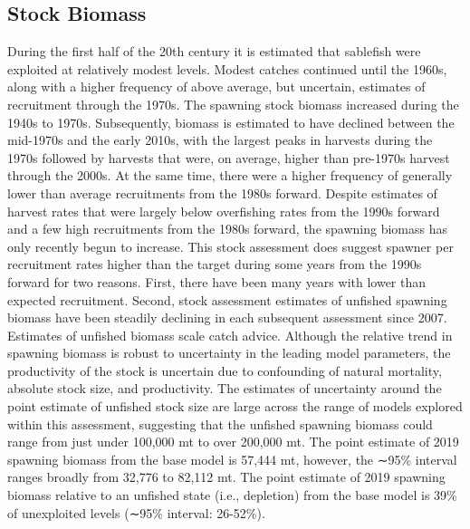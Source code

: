 \documentclass[11pt,
  english,
  a4paper,
]{article}
\begin{document}
\leavevmode\tagmcend\tagstructend\par


\hypertarget{stock-biomass}{%
\subsection*{Stock Biomass}\label{stock-biomass}}

\leavevmode\tagmcend\tagstructend


During the first half of the 20th century it is estimated that sablefish were exploited at relatively modest levels. Modest catches continued until the 1960s, along with a higher frequency of above average, but uncertain, estimates of recruitment through the 1970s. The spawning stock biomass increased during the 1940s to 1970s. Subsequently, biomass is estimated to have declined between the mid-1970s and the early 2010s, with the largest peaks in harvests during the 1970s followed by harvests that were, on average, higher than pre-1970s harvest through the 2000s. At the same time, there were a higher frequency of generally lower than average recruitments from the 1980s forward. Despite estimates of harvest rates that were largely below overfishing rates from the 1990s forward and a few high recruitments from the 1980s forward, the spawning biomass has only recently begun to increase. This stock assessment does suggest spawner per recruitment rates higher than the target during some years from the 1990s forward for two reasons. First, there have been many years with lower than expected recruitment. Second, stock assessment estimates of unfished spawning biomass have been steadily declining in each subsequent assessment since 2007. Estimates of unfished biomass scale catch advice. Although the relative trend in spawning biomass is robust to uncertainty in the leading model parameters, the productivity of the stock is uncertain due to confounding of natural mortality, absolute stock size, and productivity. The estimates of uncertainty around the point estimate of unfished stock size are large across the range of models explored within this assessment, suggesting that the unfished spawning biomass could range from just under 100,000 mt to over 200,000 mt. The point estimate of 2019 spawning biomass from the base model is 57,444 mt, however, the ∼95\% interval ranges broadly from 32,776 to 82,112 mt. The point estimate of 2019 spawning biomass relative to an unfished state (i.e., depletion) from the base model is 39\% of unexploited levels (∼95\% interval: 26-52\%).
\end{document}
